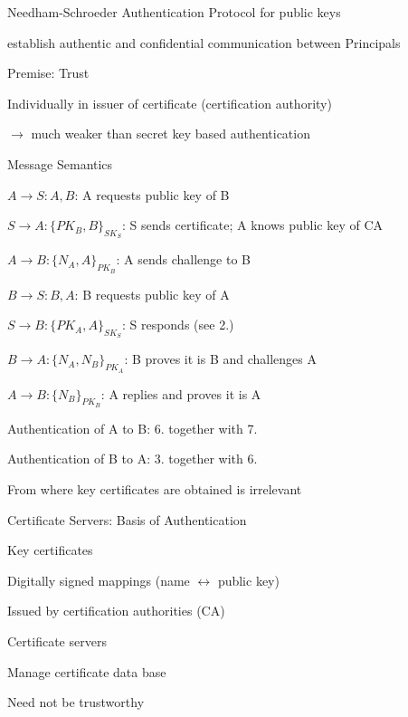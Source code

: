 \documentclass[a4paper]{article}
\begin{document}
\begin{multicols}{3}
    Needham-Schroeder Authentication Protocol for public keys
    \begin{itemize*}
        \item establish authentic and confidential communication between Principals
        \item Premise: Trust
        \begin{itemize*}
            \item Individually in issuer of certificate (certification authority)
            \item[$\rightarrow$] much weaker than secret key based authentication
        \end{itemize*}
        \item Message Semantics
        \begin{enumerate*}
            \item $A\rightarrow S:A,B$: A requests public key of B
            \item $S\rightarrow A:\{PK_B,B\}_{SK_S}$: S sends certificate; A knows public key of CA
            \item $A\rightarrow B:\{N_A,A\}_{PK_B}$: A sends challenge to B
            \item $B\rightarrow S:B,A$: B requests public key of A
            \item $S\rightarrow B:\{PK_A,A\}_{SK_S}$: S responds (see 2.)
            \item $B\rightarrow A:\{N_A, N_B\}_{PK_A}$: B proves it is B and challenges A
            \item $A\rightarrow B:\{N_B\}_{PK_B}$: A replies and proves it is A
        \end{enumerate*}
        \begin{itemize*}
            \item Authentication of A to B: 6. together with 7.
            \item Authentication of B to A: 3. together with 6.
            \item From where key certificates are obtained is irrelevant
        \end{itemize*}
    \end{itemize*}

    Certificate Servers: Basis of Authentication
    \begin{itemize*}
        \item Key certificates
        \begin{itemize*}
            \item Digitally signed mappings (name $\leftrightarrow$ public key)
            \item Issued by certification authorities (CA)
        \end{itemize*}
        \item Certificate servers
        \begin{itemize*}
            \item Manage certificate data base
            \item Need not be trustworthy
        \end{itemize*}
    \end{itemize*}


\end{multicols}
\end{document}

